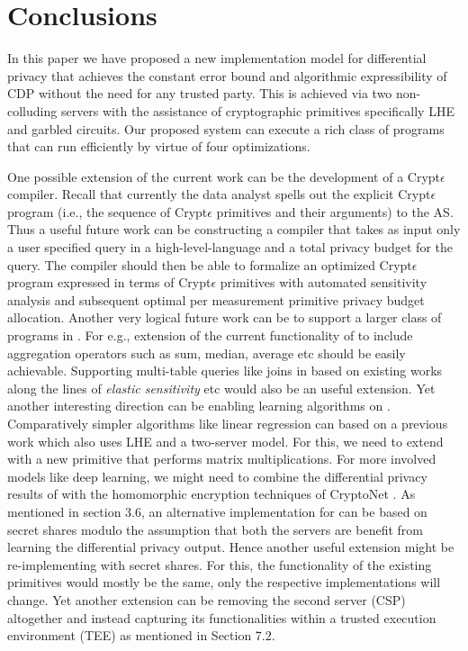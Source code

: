 
\section{Conclusions}\label{sec:conclusions}
In this paper we have proposed a new implementation model for differential privacy that achieves the constant error bound and  algorithmic expressibility of \textsf{CDP} without the need for any trusted party. This is achieved via two non-colluding servers with the assistance of cryptographic primitives specifically \textsf{LHE} and garbled circuits. Our proposed system \system can execute a rich class of programs that can run  efficiently by virtue of four optimizations.
\par  One possible extension of the current work can be the development of a
Crypt$\epsilon$ compiler. Recall that currently the data analyst spells out the explicit Crypt$\epsilon$ program  (i.e., the sequence of Crypt$\epsilon$ primitives and their arguments) to the \textsf{AS}. Thus a useful future work can be constructing a compiler that takes as input only a user specified query in a high-level-language and a total privacy budget for the query. The
compiler should then be able to formalize an optimized Crypt$\epsilon$ program expressed in terms of Crypt$\epsilon$ primitives with automated sensitivity analysis and subsequent optimal per measurement primitive privacy budget allocation. 
Another very logical future work can be to support a larger class of programs in \system. For e.g., extension of the current functionality of \system to include aggregation operators such as sum, median, average etc should be easily achievable. Supporting  multi-table queries like joins in \system based on existing works along the lines of \emph{elastic sensitivity} \cite{elastic} etc would also be an useful extension.  Yet another interesting direction can be enabling learning algorithms on \system.   Comparatively simpler algorithms like linear regression can based on a previous work \cite{LReg} which also uses \textsf{LHE} and a two-server model. For this, we need to extend \system with a new primitive that performs matrix multiplications. For more involved models like deep learning, we might need to combine the differential privacy results of \cite{DLDP} with the homomorphic encryption techniques of  CryptoNet \cite{CryptoNet}. As mentioned in section 3.6, an alternative implementation for \system  can be based on secret shares modulo the assumption that both the servers are benefit from learning the differential privacy output. Hence another useful extension might be re-implementing \system with  secret shares. For this, the functionality of the existing primitives would mostly be the same, only the respective implementations will change. 
Yet another extension can be removing the second server (\textsf{CSP}) altogether and instead capturing its functionalities within a trusted execution environment (TEE) as mentioned in Section 7.2.
